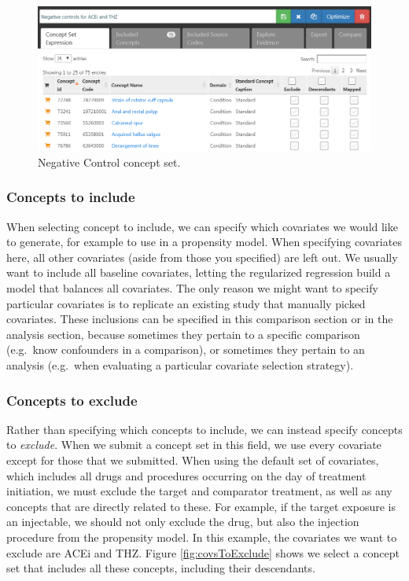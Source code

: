 \documentclass[11pt]{book}
\theoremstyle{definition}
\theoremstyle{definition}
\theoremstyle{definition}
\theoremstyle{remark}
\begin{document}
\begin{figure}

{\centering \includegraphics[width=1\linewidth]{images/PopulationLevelEstimation/ncConceptSet} 

}

\caption{Negative Control concept set.}\label{fig:ncConceptSet}
\end{figure}

\hypertarget{concepts-to-include}{%
\subsubsection*{Concepts to include}\label{concepts-to-include}}

When selecting concept to include, we can specify which covariates we would like to generate, for example to use in a propensity model. When specifying covariates here, all other covariates (aside from those you specified) are left out. We usually want to include all baseline covariates, letting the regularized regression build a model that balances all covariates. The only reason we might want to specify particular covariates is to replicate an existing study that manually picked covariates. These inclusions can be specified in this comparison section or in the analysis section, because sometimes they pertain to a specific comparison (e.g.~know confounders in a comparison), or sometimes they pertain to an analysis (e.g.~when evaluating a particular covariate selection strategy).

\hypertarget{concepts-to-exclude}{%
\subsubsection*{Concepts to exclude}\label{concepts-to-exclude}}

Rather than specifying which concepts to include, we can instead specify concepts to \emph{exclude}. When we submit a concept set in this field, we use every covariate except for those that we submitted. When using the default set of covariates, which includes all drugs and procedures occurring on the day of treatment initiation, we must exclude the target and comparator treatment, as well as any concepts that are directly related to these. For example, if the target exposure is an injectable, we should not only exclude the drug, but also the injection procedure from the propensity model. In this example, the covariates we want to exclude are ACEi and THZ. Figure \ref{fig:covsToExclude} shows we select a concept set that includes all these concepts, including their descendants.
\end{document}
